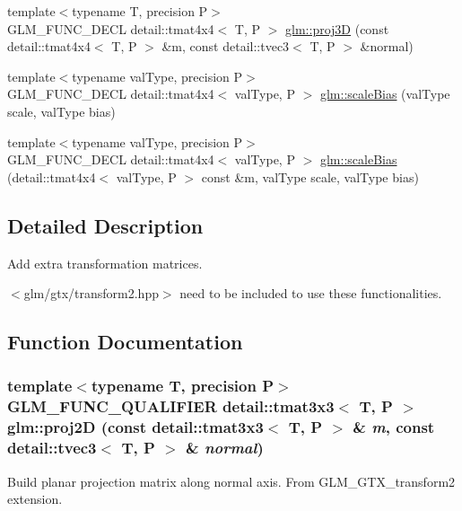 \begin{CompactItemize}
\item 
{\footnotesize template$<$typename T, precision P$>$ }\\GLM\_\-FUNC\_\-DECL detail::tmat4x4$<$ T, P $>$ \hyperlink{group__gtx__transform2_gea404ce6c1541825232f418242bff9fb}{glm::proj3D} (const detail::tmat4x4$<$ T, P $>$ \&m, const detail::tvec3$<$ T, P $>$ \&normal)
\item 
{\footnotesize template$<$typename valType, precision P$>$ }\\GLM\_\-FUNC\_\-DECL detail::tmat4x4$<$ valType, P $>$ \hyperlink{group__gtx__transform2_gd75c85daca353804c161589fe32ce107}{glm::scaleBias} (valType scale, valType bias)
\item 
{\footnotesize template$<$typename valType, precision P$>$ }\\GLM\_\-FUNC\_\-DECL detail::tmat4x4$<$ valType, P $>$ \hyperlink{group__gtx__transform2_g235e65153daa1bdc12fcc07c8019931b}{glm::scaleBias} (detail::tmat4x4$<$ valType, P $>$ const \&m, valType scale, valType bias)
\end{CompactItemize}


\subsection{Detailed Description}
Add extra transformation matrices. 

$<$glm/gtx/transform2.hpp$>$ need to be included to use these functionalities. 

\subsection{Function Documentation}
\hypertarget{group__gtx__transform2_gcee3ec4d06d03a1cf9f4037c4effc2e4}{
\subsubsection[proj2D]{\setlength{\rightskip}{0pt plus 5cm}template$<$typename T, precision P$>$ GLM\_\-FUNC\_\-QUALIFIER detail::tmat3x3$<$ T, P $>$ glm::proj2D (const detail::tmat3x3$<$ T, P $>$ \& {\em m}, \/  const detail::tvec3$<$ T, P $>$ \& {\em normal})}}
\label{group__gtx__transform2_gcee3ec4d06d03a1cf9f4037c4effc2e4}


Build planar projection matrix along normal axis. From GLM\_\-GTX\_\-transform2 extension. 

